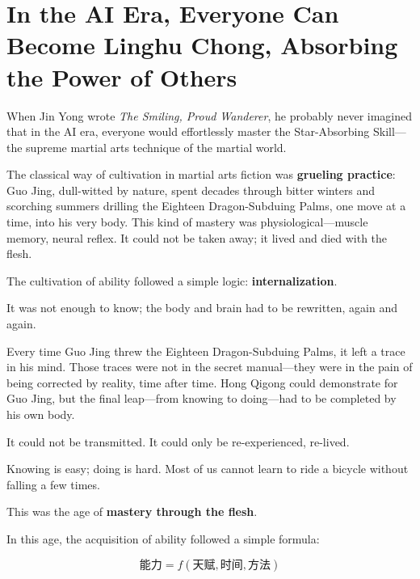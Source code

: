 \section{In the AI Era, Everyone Can Become Linghu Chong, Absorbing the Power of Others}

When Jin Yong wrote \textit{The Smiling, Proud Wanderer}, he probably never imagined that in the AI era, everyone would effortlessly master the Star-Absorbing Skill---the supreme martial arts technique of the martial world.

The classical way of cultivation in martial arts fiction was \textbf{grueling practice}: Guo Jing, dull-witted by nature, spent decades through bitter winters and scorching summers drilling the Eighteen Dragon-Subduing Palms, one move at a time, into his very body. This kind of mastery was physiological---muscle memory, neural reflex. It could not be taken away; it lived and died with the flesh.

\vspace{1em}

The cultivation of ability followed a simple logic: \textbf{internalization}.

It was not enough to know; the body and brain had to be rewritten, again and again.

Every time Guo Jing threw the Eighteen Dragon-Subduing Palms, it left a trace in his mind. Those traces were not in the secret manual---they were in the pain of being corrected by reality, time after time. Hong Qigong could demonstrate for Guo Jing, but the final leap---from knowing to doing---had to be completed by his own body.

\vspace{1em}

It could not be transmitted. It could only be re-experienced, re-lived.

Knowing is easy; doing is hard. Most of us cannot learn to ride a bicycle without falling a few times.

This was the age of \textbf{mastery through the flesh}.

\vspace{1em}

In this age, the acquisition of ability followed a simple formula:

\begin{equation*}
\text{能力} = f(\text{天赋}, \text{时间}, \text{方法})
\end{equation*}

